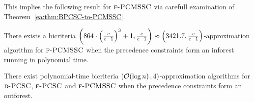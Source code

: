 This implies the following result for $\textup{\textsc{f-PCMSSC}}$ via carefull examination of Theorem~\ref{ea:thm:BPCSC-to-PCMSSC}.
\begin{corollary}\label{ea:cor:BPCSC-inforest-to-PCMSSC}
    There exists a bicriteria $\mathopen{}\left( 864\cdot\mathopen{}\left( \frac{e}{e-1} \right)^3+1, \frac{e}{e-1} \right)\approx\mathopen{}\left( 3421.7, \frac{e}{e-1} \right)$-approximation algorithm for $\textup{\textsc{f-PCMSSC}}$ when the precedence constraints form an inforest running in polynomial time.
\end{corollary}
\begin{theorem}\label{ea:thm:BPCSC-outforest}
    There exist polynomial-time bicriteria $\mathopen{}\left( \mathcal{O}\mathopen{}\left( \log n \right), 4 \right)$-approximation algorithms for $\textup{\textsc{b-PCSC}}$,  $\textup{\textsc{f-PCSC}}$ and $\textup{\textsc{f-PCMSSC}}$ when the precedence constraints form an outforest.
\end{theorem}
    


